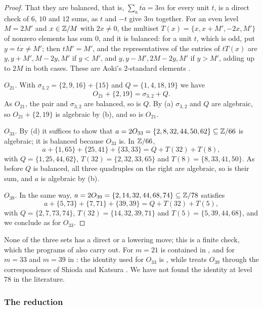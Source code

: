 \begin{proof}
That they are balanced, that is, $\sum_{a}\overline{ta}=3m$ for every unit
$t$, is a direct check of $6$, $10$ and $12$ sums, as $t$ and $-t$ give
$3m$ together. For an even level $M=2M'$ and
$x\in\mathbb{Z}/M$ with $2x\ne0$, the multiset $T(x)=\{x,x+M',-2x,M'\}$ of nonzero
elements has sum $0$, and it is balanced: for a unit $t$, which is odd, put
$y=\overline{tx}\ne M'$; then $tM'=M'$, and the representatives of the
entries of $tT(x)$ are $y,y+M',M-2y,M'$ if $y<M'$, and $y,y-M',2M-2y,M'$ if
$y>M'$, adding up to $2M$ in both cases. These are Aoki's $2$-standard
elements \cite[\S1]{Aok87}.

\emph{$O_{21}$.} With $\sigma_{3,2}=\{2,9,16\}+\{15\}$ and $Q=\{1,4,18,19\}$
we have
\[
  O_{21}+\{2,19\}=\sigma_{3,2}+Q.
\]
As $O_{21}$, the pair and $\sigma_{3,2}$ are balanced, so is $Q$. By
(a) $\sigma_{3,2}$ and $Q$ are algebraic, so
$O_{21}+\{2,19\}$ is algebraic by (b), and so is
$O_{21}$.

\emph{$O_{33}$.} By (d) it suffices to show that
$a=2O_{33}=\{2,8,32,44,50,62\}\subseteq\mathbb{Z}/66$ is algebraic; it is balanced
because $O_{33}$ is. In $\mathbb{Z}/66$,
\[
  a+\{1,65\}+\{25,41\}+\{33,33\}=Q+T(32)+T(8),
\]
with $Q=\{1,25,44,62\}$, $T(32)=\{2,32,33,65\}$ and $T(8)=\{8,33,41,50\}$.
As before $Q$ is balanced, all three quadruples on the right are algebraic,
so is their sum, and $a$ is algebraic by (b).

\emph{$O_{39}$.} In the same way, $a=2O_{39}=\{2,14,32,44,68,74\}\subseteq
\mathbb{Z}/78$ satisfies
\[
  a+\{5,73\}+\{7,71\}+\{39,39\}=Q+T(32)+T(5),
\]
with $Q=\{2,7,73,74\}$, $T(32)=\{14,32,39,71\}$ and $T(5)=\{5,39,44,68\}$,
and we conclude as for $O_{33}$.
\end{proof}

None of the three sets has a direct or a lowering move; this is a finite
check, which the programs of  also carry out. For $m=21$
 is contained in \cite{daS21}, and for $m=33$ and
$m=39$ in \cite{Jum26}: the identity used for $O_{33}$ is
\cite[Theorem~1.4]{Jum26}, while \cite{Jum26} treats $O_{39}$ through the
correspondence of Shioda and Katsura \cite[Theorem~1.2]{Jum26}. We have not
found the identity at level $78$ in the literature.

\subsubsection*{The reduction}

